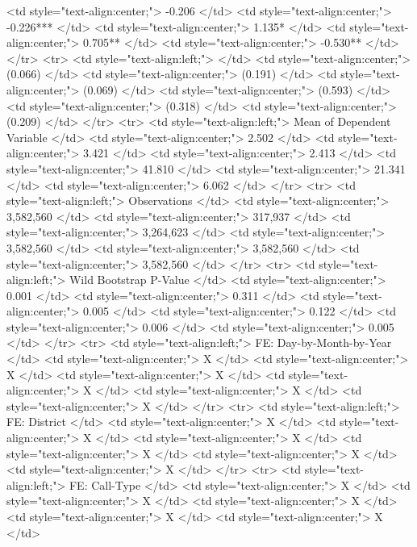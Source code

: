    <td style="text-align:center;"> -0.206 </td>
   <td style="text-align:center;"> -0.226*** </td>
   <td style="text-align:center;"> 1.135* </td>
   <td style="text-align:center;"> 0.705** </td>
   <td style="text-align:center;"> -0.530** </td>
  </tr>
  <tr>
   <td style="text-align:left;">  </td>
   <td style="text-align:center;"> (0.066) </td>
   <td style="text-align:center;"> (0.191) </td>
   <td style="text-align:center;"> (0.069) </td>
   <td style="text-align:center;"> (0.593) </td>
   <td style="text-align:center;"> (0.318) </td>
   <td style="text-align:center;"> (0.209) </td>
  </tr>
  <tr>
   <td style="text-align:left;"> Mean of Dependent Variable </td>
   <td style="text-align:center;"> 2.502 </td>
   <td style="text-align:center;"> 3.421 </td>
   <td style="text-align:center;"> 2.413 </td>
   <td style="text-align:center;"> 41.810 </td>
   <td style="text-align:center;"> 21.341 </td>
   <td style="text-align:center;"> 6.062 </td>
  </tr>
  <tr>
   <td style="text-align:left;"> Observations </td>
   <td style="text-align:center;"> 3,582,560 </td>
   <td style="text-align:center;"> 317,937 </td>
   <td style="text-align:center;"> 3,264,623 </td>
   <td style="text-align:center;"> 3,582,560 </td>
   <td style="text-align:center;"> 3,582,560 </td>
   <td style="text-align:center;"> 3,582,560 </td>
  </tr>
  <tr>
   <td style="text-align:left;"> Wild Bootstrap P-Value </td>
   <td style="text-align:center;"> 0.001 </td>
   <td style="text-align:center;"> 0.311 </td>
   <td style="text-align:center;"> 0.005 </td>
   <td style="text-align:center;"> 0.122 </td>
   <td style="text-align:center;"> 0.006 </td>
   <td style="text-align:center;"> 0.005 </td>
  </tr>
  <tr>
   <td style="text-align:left;"> FE: Day-by-Month-by-Year </td>
   <td style="text-align:center;"> X </td>
   <td style="text-align:center;"> X </td>
   <td style="text-align:center;"> X </td>
   <td style="text-align:center;"> X </td>
   <td style="text-align:center;"> X </td>
   <td style="text-align:center;"> X </td>
  </tr>
  <tr>
   <td style="text-align:left;"> FE: District </td>
   <td style="text-align:center;"> X </td>
   <td style="text-align:center;"> X </td>
   <td style="text-align:center;"> X </td>
   <td style="text-align:center;"> X </td>
   <td style="text-align:center;"> X </td>
   <td style="text-align:center;"> X </td>
  </tr>
  <tr>
   <td style="text-align:left;"> FE: Call-Type </td>
   <td style="text-align:center;"> X </td>
   <td style="text-align:center;"> X </td>
   <td style="text-align:center;"> X </td>
   <td style="text-align:center;"> X </td>
   <td style="text-align:center;"> X </td>
